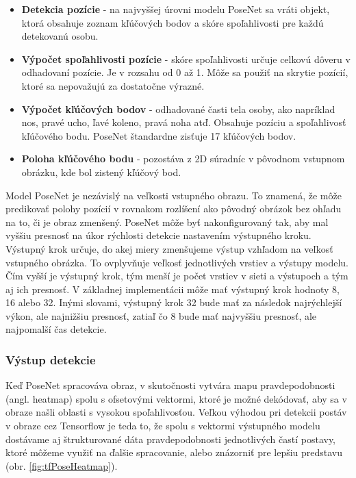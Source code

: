 \documentclass[slovak,master,dept460,male,cpp,cpdeclaration]{diploma}
\begin{document}
\begin{itemize}
\item \textbf{Detekcia pozície} - na najvyššej úrovni modelu PoseNet sa vráti objekt, ktorá obsahuje zoznam kľúčových bodov a skóre spoľahlivosti pre každú detekovanú osobu.
\item \textbf{Výpočet spoľahlivosti pozície} - skóre spoľahlivosti určuje celkovú dôveru v odhadovaní pozície. Je v rozsahu od 0 až 1. Môže sa použiť na skrytie pozícií, ktoré sa nepovažujú za dostatočne výrazné.
\item \textbf{Výpočet kľúčových bodov} - odhadované časti tela osoby, ako napríklad nos, pravé ucho, ľavé koleno, pravá noha atď. Obsahuje pozíciu a spoľahlivosť kľúčového bodu. PoseNet štandardne zisťuje 17 kľúčových bodov.
\item \textbf{Poloha kľúčového bodu} - pozostáva z 2D súradníc v pôvodnom vstupnom obrázku, kde bol zistený kľúčový bod.
\end{itemize}


Model PoseNet je nezávislý na veľkosti vstupného obrazu. To znamená, že môže predikovať polohy pozícií v rovnakom rozlíšení ako pôvodný obrázok bez ohľadu na to, či je obraz zmenšený. PoseNet môže byť nakonfigurovaný tak, aby mal vyššiu presnosť na úkor rýchlosti detekcie nastavením výstupného kroku. Výstupný krok určuje, do akej miery zmenšujeme výstup vzhľadom na veľkosť vstupného obrázka. To ovplyvňuje veľkosť jednotlivých vrstiev a výstupy modelu. Čím vyšší je výstupný krok, tým menší je počet vrstiev v sieti a výstupoch a tým aj ich presnosť. V základnej implementácii môže mať výstupný krok hodnoty 8, 16 alebo 32. Inými slovami, výstupný krok 32 bude mať za následok najrýchlejší výkon, ale najnižšiu presnosť, zatiaľ čo 8 bude mať najvyššiu presnosť, ale najpomalší čas detekcie.


\subsubsection*{Výstup detekcie}
Keď PoseNet spracováva obraz, v skutočnosti vytvára mapu pravdepodobnosti (angl. heatmap) spolu s ofsetovými vektormi, ktoré je možné dekódovať, aby sa v obraze našli oblasti s vysokou spoľahlivosťou. Veľkou výhodou pri detekcii postáv v obraze cez Tensorflow je teda to, že spolu s vektormi výstupného modelu dostávame aj štrukturované dáta pravdepodobnosti jednotlivých častí postavy, ktoré môžeme využiť na ďalšie spracovanie, alebo znázorniť pre lepšiu predstavu (obr. \ref{fig:tfPoseHeatmap}).
\end{document}
